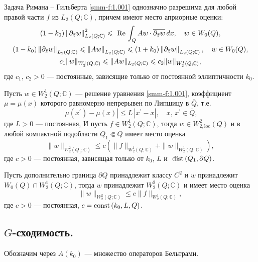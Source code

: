 \begin{theorem}\label{smm-th1.1}
Задача Римана -- Гильберта { \eqref{smm-f:1.001}} однозначно разрешима для любой правой части $f$ из $L_2(Q;\mathbb{C})$,
причем имеют место априорные оценки:
\begin{gather*}
(1-k_0)\left\|\partial_{\bar{z}}w\right\|^2_{L_2(Q;\mathbb{C})}\leqslant \text{ Re\,} \int_{Q} Aw\cdot \overline{\partial_{\bar{z}}w}\,dx,\quad w\in W_0(Q),\\
(1-k_0)\left\|\partial_{\bar{z}}w\right\|_{L_2(Q;\mathbb{C})}\leqslant \left\| Aw\right\|_{L_2(Q;\mathbb{C})} \leqslant
(1+k_0)\left\|\partial_{\bar{z}}w\right\|_{L_2(Q;\mathbb{C})}, \quad w\in W_0(Q),\\
	c_1\|w\|_{W^1_2(Q;\mathbb{C})}\leqslant\|Aw\|_{L_2(Q;\mathbb{C})}\leqslant c_2 \|w\|_{W^1_2(Q;\mathbb{C})},
\end{gather*}
где $c_1$, $c_2>0$ --- постоянные, зависящие только от постоянной эллиптичности $k_0$.


\hspace{5.mm} Пусть $w\in W_2^1(Q;\mathbb{C})$ --- решение уравнения  { \eqref{smm-f:1.001}}, коэффициент $\mu=\mu(x)$ которого равномерно непрерывен по Липшицу в $\overline Q$, т.е.
$$
|\mu(x^\prime)-\mu(x)|\leqslant L\,|x^\prime-x|,\quad x,\,x^\prime\in \overline{Q},
$$
где $L>0$ --- постоянная, И пусть  $f\in W_2^1(Q;\mathbb{C})$, тогда $w\in W_{2,\text{loc}}^2(Q)$ и в любой компактной подобласти $Q_1\Subset Q$ имеет место оценка
\begin{equation*}
	\|w\|_{W^2_2(Q_1; \mathbb{C})}\leqslant c\left(\|f\|_{W^1_2(Q; \mathbb{C})}+\|w\|_{W^1_2(Q; \mathbb{C})}\right),
\end{equation*}
где $c>0$ --- постоянная, зависящая только от $k_0$, $L$ и $\text{ dist\,}(Q_1,\partial Q)$.

\hspace{5.mm} Пусть дополнительно граница $\partial Q$ принадлежит классу $C^2$ и $w$ принадлежит $W_0(Q)\cap W_2^1(Q; \mathbb{C})$, тогда $w$ принадлежит $W_2^2(Q; \mathbb{C})$ и имеет место оценка
\begin{equation*}
\|w\|_{W^2_2(Q; \mathbb{C})}\leqslant c\|f\|_{W^1_2(Q; \mathbb{C})},
\end{equation*}
где $c>0$ --- постоянная, $c=\text{const\,}(k_0, L, Q)$.
\end{theorem}





\subsection{$G$-сходимость.}
Обозначим через $A(k_0)$ --- множество операторов Бельтрами.

